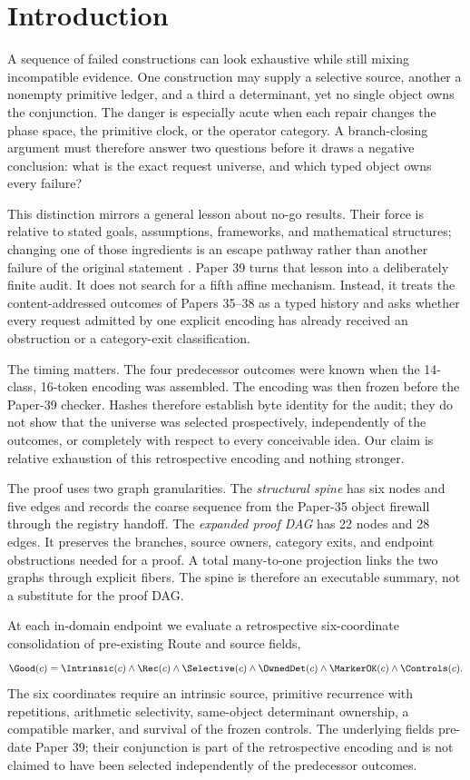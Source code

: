 \section{Introduction}
\label{sec:introduction}

A sequence of failed constructions can look exhaustive while still mixing
incompatible evidence.  One construction may supply a selective source,
another a nonempty primitive ledger, and a third a determinant, yet no single
object owns the conjunction.  The danger is especially acute when each repair
changes the phase space, the primitive clock, or the operator category.  A
branch-closing argument must therefore answer two questions before it draws a
negative conclusion: what is the exact request universe, and which typed object
owns every failure?

This distinction mirrors a general lesson about no-go results.  Their force is
relative to stated goals, assumptions, frameworks, and mathematical structures;
changing one of those ingredients is an escape pathway rather than another
failure of the original statement \citep{Dardashti2021NoGo}.  Paper 39 turns
that lesson into a deliberately finite audit.  It does not search for a fifth
affine mechanism.  Instead, it treats the content-addressed outcomes of Papers
35--38 as a typed history and asks whether every request admitted by one
explicit encoding has already received an obstruction or a category-exit
classification.

The timing matters.  The four predecessor outcomes were known when the
14-class, 16-token encoding was assembled.  The encoding was then frozen before
the Paper-39 checker.  Hashes therefore establish byte identity for the audit;
they do not show that the universe was selected prospectively, independently of
the outcomes, or completely with respect to every conceivable idea.  Our claim
is relative exhaustion of this retrospective encoding and nothing stronger.

The proof uses two graph granularities.  The \emph{structural spine} has six
nodes and five edges and records the coarse sequence from the Paper-35 object
firewall through the registry handoff.  The \emph{expanded proof DAG} has 22
nodes and 28 edges.  It preserves the branches, source owners, category exits,
and endpoint obstructions needed for a proof.  A total many-to-one projection
links the two graphs through explicit fibers.  The spine is therefore an
executable summary, not a substitute for the proof DAG.

At each in-domain endpoint we evaluate a retrospective six-coordinate
consolidation of pre-existing Route and source fields,
\begin{equation}
  \Good(c)=\Intrinsic(c)\wedge\Rec(c)\wedge\Selective(c)
  \wedge\OwnedDet(c)\wedge\MarkerOK(c)\wedge\Controls(c).
  \label{eq:good-intro}
\end{equation}
The six coordinates require an intrinsic source, primitive recurrence with
repetitions, arithmetic selectivity, same-object determinant ownership, a
compatible marker, and survival of the frozen controls.  The underlying fields
pre-date Paper 39; their conjunction is part of the retrospective encoding and
is not claimed to have been selected independently of the predecessor outcomes.

